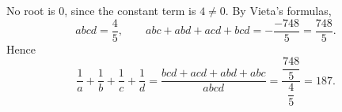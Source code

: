 No root is $0$, since the constant term is $4\ne0$. By Vieta's formulas,
\[abcd=\dfrac45,\qquad abc+abd+acd+bcd=-\dfrac{-748}{5}=\dfrac{748}{5}.\]
Hence
\[\dfrac1a+\dfrac1b+\dfrac1c+\dfrac1d=\dfrac{bcd+acd+abd+abc}{abcd}=\dfrac{\dfrac{748}{5}}{\dfrac45}=\boxed{187}.\]
